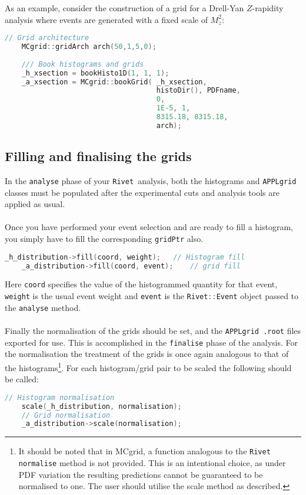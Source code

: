\documentclass[11pt]{article}
\newcommand{\rivet} {{\tt Rivet }}
\newcommand{\appl} {{\tt APPLgrid }}
\begin{document}
 As an example, consider the construction of a grid for a Drell-Yan $Z$-rapidity analysis where events are generated with a fixed scale of $M_z^2$:
   \begin{lstlisting}[language=c++]
    // Grid architecture
    MCgrid::gridArch arch(50,1,5,0);
   
    /// Book histograms and grids
    _h_xsection = bookHisto1D(1, 1, 1);
    _a_xsection = MCgrid::bookGrid(	_h_xsection,
    								histoDir(), PDFname,
     								0, 
									1E-5, 1,
									8315.18, 8315.18,
									arch);
\end{lstlisting}

\subsection{Filling and finalising the grids}
In the \lstinline[language=c++]{analyse} phase of your \rivet analysis, both the histograms and \appl classes must be populated after the experimental cuts and analysis tools are applied as usual.\\\\
Once you have performed your event selection and are ready to fill a histogram, you simply have to fill the corresponding \lstinline[language=c++]{gridPtr} also. 
   \begin{lstlisting}[language=c++]
	_h_distribution->fill(coord, weight);	// Histogram fill  
	_a_distribution->fill(coord, event);	// grid fill
\end{lstlisting}
Here \lstinline[language=c++]{coord} specifies the value of the histogrammed quantity for that event, \lstinline[language=c++]{weight} is the usual event weight and \lstinline[language=c++]{event} is the \lstinline[language=c++]{Rivet::Event} object passed to the \lstinline[language=c++]{analyse} method.
\\\\
Finally the normalisation of the grids should be set, and the \appl \lstinline[language=bash]{.root} files exported for use. This is accomplished in the \lstinline[language=c++]{finalise} phase of the analysis. For the normalisation the treatment of the grids is once again analogous to that of the histograms\footnote{It should be noted that in MCgrid, a function analogous to the {\tt Rivet} \lstinline[language=c++]{normalise} method is not provided. This is an intentional choice, as under PDF variation the resulting predictions cannot be guaranteed to be normalised to one. The user should utilise the scale method as described.}. For each histogram/grid pair to be scaled the following should be called:
   \begin{lstlisting}[language=c++]
	// Histogram normalisation
	scale(_h_distribution, normalisation);	
	// Grid normalisation
	_a_distribution->scale(normalisation);	
\end{lstlisting}
\end{document}

